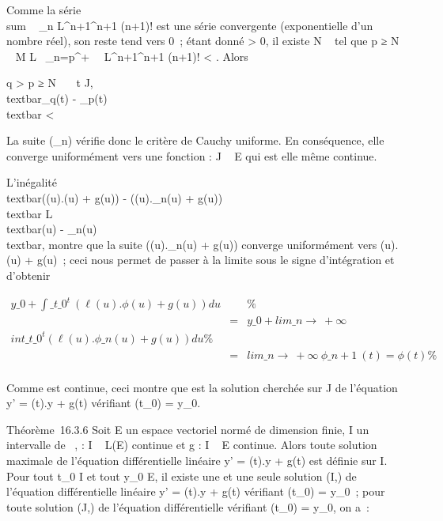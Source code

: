 \documentclass[]{article}
\begin{document}
Comme la série \\sum ~
\_n L^n+1\eta^n+1 \over
(n+1)! est une série convergente (exponentielle d'un nombre réel), son
reste tend vers 0~; étant donné \epsilon \textgreater{} 0, il existe N \in {}~ tel
que p ≥ N \rigtharrow~ M \over L \
\sum  \_n=p^+\infty~~
L^n+1\eta^n+1 \over (n+1)!
\textless{} \epsilon. Alors

q \textgreater{} p ≥ N \rigtharrow~\forall~~t \in J,
\\textbar{}\phi\_q(t) -
\phi\_p(t)\\textbar{} \textless{} \epsilon

La suite (\phi\_n) vérifie donc le critère de Cauchy uniforme. En
conséquence, elle converge uniformément vers une fonction \phi : J \rightarrow~ E qui
est elle même continue.

L'inégalité \\textbar{}(\ell(u).\phi(u) + g(u)) -
(\ell(u).\phi\_n(u) + g(u))\\textbar{} \leq
L\\textbar{}\phi(u) -
\phi\_n(u)\\textbar{}, montre que la suite
\left (\ell(u).\phi\_n(u) + g(u)\right )
converge uniformément vers \ell(u).\phi(u) + g(u)~; ceci nous permet de passer
à la limite sous le signe d'intégration et d'obtenir

\begin{align*} y\_0
+\int  \_t\_0^t~(\ell(u).\phi(u)
+ g(u)) du&& \%& \\ & =& y\_0
+ lim\_n\rightarrow~+\infty~~\\int
 \_t\_0^t(\ell(u).\phi\_ n(u) + g(u)) du\%&
\\ & =&
lim\_n\rightarrow~+\infty~\phi\_n+1~(t) = \phi(t) \%&
\\ \end{align*}

Comme \phi est continue, ceci montre que \phi est la solution cherchée sur J
de l'équation y' = \ell(t).y + g(t) vérifiant \phi(t\_0) =
y\_0.

Théorème~16.3.6 Soit E un espace vectoriel normé de dimension finie, I
un intervalle de \mathbb{R}~, \ell : I \rightarrow~ L(E) continue et g : I \rightarrow~ E continue. Alors
toute solution maximale de l'équation différentielle linéaire y' =
\ell(t).y + g(t) est définie sur I. Pour tout t\_0 \in I et tout
y\_0 \in E, il existe une et une seule solution (I,\phi) de
l'équation différentielle linéaire y' = \ell(t).y + g(t) vérifiant
\phi(t\_0) = y\_0~; pour toute solution (J,\psi) de l'équation
différentielle vérifiant \psi(t\_0) = y\_0, on a~:
\end{document}
